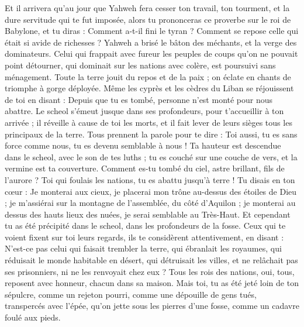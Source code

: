 \begin{multicols}{2}
Et il arrivera qu'au jour que Yahweh fera cesser ton travail, ton tourment, et la dure servitude qui te fut imposée,
alors tu prononceras ce proverbe sur le roi de Babylone, et tu diras : Comment a-t-il fini le tyran ? Comment se repose celle qui était si avide de richesses ?
Yahweh a brisé le bâton des méchants, et la verge des dominateurs.
Celui qui frappait avec fureur les peuples de coups qu'on ne pouvait point détourner, qui dominait sur les nations avec colère, est poursuivi sans ménagement.
Toute la terre jouit du repos et de la paix ; on éclate en chants de triomphe à gorge déployée.
Même les cyprès et les cèdres du Liban se réjouissent de toi en disant : Depuis que tu es tombé, personne n'est monté pour nous abattre.
Le scheol s'émeut jusque dans ses profondeurs, pour t'accueillir à ton arrivée ; il réveille à cause de toi les morts, et il fait lever de leurs sièges tous les principaux de la terre.
Tous prennent la parole pour te dire : Toi aussi, tu es sans force comme nous, tu es devenu semblable à nous !
Ta hauteur est descendue dans le scheol, avec le son de tes luths ; tu es couché sur une couche de vers, et la vermine est ta couverture.
Comment es-tu tombé du ciel, astre brillant, fils de l'aurore ? Toi qui foulais les nations, tu es abattu jusqu'à terre !
Tu disais en ton cœur : Je monterai aux cieux, je placerai mon trône au-dessus des étoiles de Dieu ; je m'assiérai sur la montagne de l'assemblée, du côté d'Aquilon ;
je monterai au dessus des hauts lieux des nuées, je serai semblable au Très-Haut.
Et cependant tu as été précipité dans le scheol, dans les profondeurs de la fosse.
Ceux qui te voient fixent sur toi leurs regards, ils te considèrent attentivement, en disant : N'est-ce pas celui qui faisait trembler la terre, qui ébranlait les royaumes,
qui réduisait le monde habitable en désert, qui détruisait les villes, et ne relâchait pas ses prisonniers, ni ne les renvoyait chez eux ?
Tous les rois des nations, oui, tous, reposent avec honneur, chacun dans sa maison.
Mais toi, tu as été jeté loin de ton sépulcre, comme un rejeton pourri, comme une dépouille de gens tués, transpercés avec l'épée, qu'on jette sous les pierres d'une fosse, comme un cadavre foulé aux pieds.

\end{multicols}
